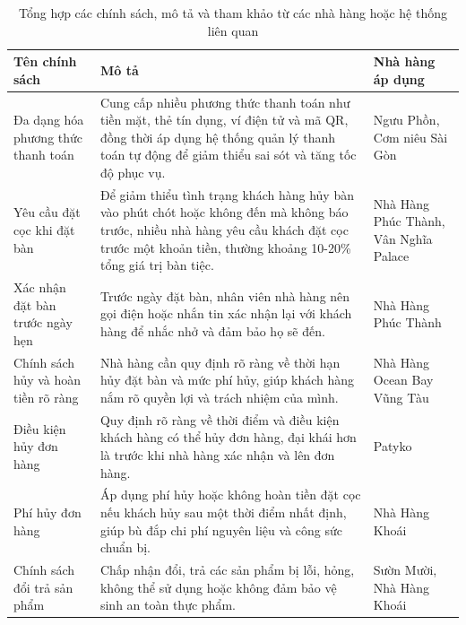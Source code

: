 \begin{table}[H]
	\centering
	\caption{Tổng hợp các chính sách, mô tả và tham khảo từ các nhà hàng hoặc hệ thống liên quan}
	\begin{tabular}{|p{4cm}|p{8cm}|p{4cm}|}
		\hline
		\textbf{Tên chính sách}             & \textbf{Mô tả}                                                                                                                                                                                       & \textbf{Nhà hàng áp dụng}             \\
		\hline
		Đa dạng hóa phương thức thanh toán  & Cung cấp nhiều phương thức thanh toán như tiền mặt, thẻ tín dụng, ví điện tử và mã QR, đồng thời áp dụng hệ thống quản lý thanh toán tự động để giảm thiểu sai sót và tăng tốc độ phục vụ.           & Ngưu Phồn, Cơm niêu Sài Gòn           \\
		\hline
		Yêu cầu đặt cọc khi đặt bàn         & Để giảm thiểu tình trạng khách hàng hủy bàn vào phút chót hoặc không đến mà không báo trước, nhiều nhà hàng yêu cầu khách đặt cọc trước một khoản tiền, thường khoảng 10-20\% tổng giá trị bàn tiệc. & Nhà Hàng Phúc Thành, Vân Nghĩa Palace \\
		\hline
		Xác nhận đặt bàn trước ngày hẹn     & Trước ngày đặt bàn, nhân viên nhà hàng nên gọi điện hoặc nhắn tin xác nhận lại với khách hàng để nhắc nhở và đảm bảo họ sẽ đến.                                                                      & Nhà Hàng Phúc Thành                   \\
		\hline
		Chính sách hủy và hoàn tiền rõ ràng & Nhà hàng cần quy định rõ ràng về thời hạn hủy đặt bàn và mức phí hủy, giúp khách hàng nắm rõ quyền lợi và trách nhiệm của mình.                                                                      & Nhà Hàng Ocean Bay Vũng Tàu           \\
		\hline
		Điều kiện hủy đơn hàng              & Quy định rõ ràng về thời điểm và điều kiện khách hàng có thể hủy đơn hàng, đại khái hơn là trước khi nhà hàng xác nhận và lên đơn hàng.                                                              & Patyko                                \\
		\hline
		Phí hủy đơn hàng                    & Áp dụng phí hủy hoặc không hoàn tiền đặt cọc nếu khách hủy sau một thời điểm nhất định, giúp bù đắp chi phí nguyên liệu và công sức chuẩn bị.                                                        & Nhà Hàng Khoái                        \\
		\hline
		Chính sách đổi trả sản phẩm         & Chấp nhận đổi, trả các sản phẩm bị lỗi, hỏng, không thể sử dụng hoặc không đảm bảo vệ sinh an toàn thực phẩm.                                                                                        & Sườn Mười, Nhà Hàng Khoái             \\
		\hline
	\end{tabular}
\end{table}

